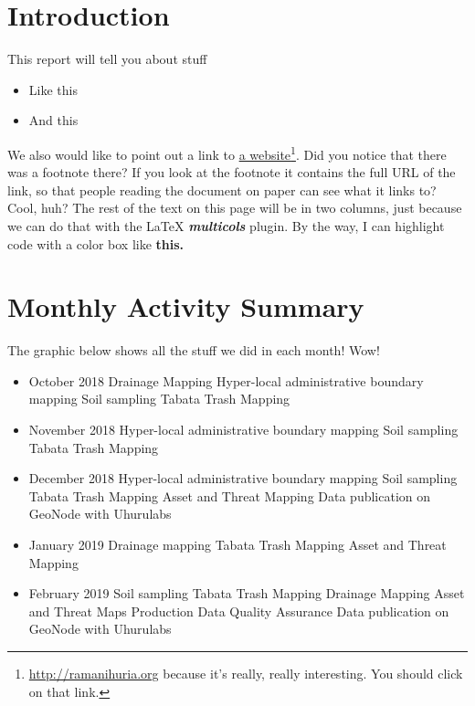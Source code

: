 \documentclass[a4paper,12pt,twoside]{article}
\begin{document}

\newpage
\section{Introduction}
\label{Introduction}

This report will tell you about stuff

\begin{itemize}
  \item Like this
  \item And this
\end{itemize}

We also would like to point out a link to  \href{https://ramanihuria.org}{a website}\footnote{\url{http://ramanihuria.org}\color{RHgrey} { }because it's really, really interesting. You should click on that link.}. Did you notice that there was a footnote there? If you look at the footnote it contains the full URL of the link, so that people reading the document on paper can see what it links to? Cool, huh? The rest of the text on this page will be in two columns, just because we can do that with the \LaTeX{} \textbf{\textit{multicols}} plugin. By the way, I can highlight code with a color box like \textbf{\colorbox{code}{this.}}

\begin{multicols}{2}

  \lipsum[5-8]
  
\end{multicols}

\newpage
\section{Monthly Activity Summary}

The graphic below shows all the stuff we did in each month! Wow!

\bigskip

\begin{itemize}
    \item October 2018
Drainage Mapping
Hyper-local administrative boundary mapping
Soil sampling
Tabata Trash Mapping
    \item November 2018
Hyper-local administrative boundary mapping
Soil sampling
Tabata Trash Mapping
    \item December 2018
Hyper-local administrative boundary mapping
Soil sampling
Tabata Trash Mapping
Asset and Threat Mapping
Data publication on GeoNode with Uhurulabs
    \item January 2019
Drainage mapping
Tabata Trash Mapping
Asset and Threat Mapping
    \item February 2019
Soil sampling
Tabata Trash Mapping
Drainage Mapping
Asset and Threat Maps Production
Data Quality Assurance
Data publication on GeoNode with Uhurulabs
\end{itemize}
\end{document}
